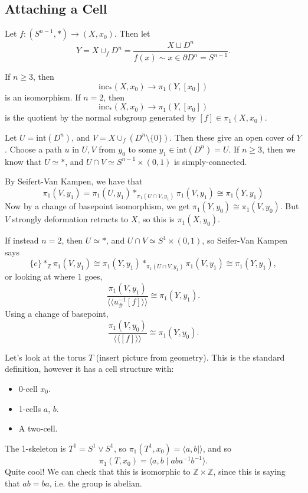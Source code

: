 \documentclass[12pt]{article}
\begin{document}
\subsection{Attaching a Cell}
\label{sub:+_cell}

Let $f : (S^{n-1}, \ast) \to (X, x_0)$. Then let
\[
Y = X \cup_f D^n = \frac{X \sqcup D^n}{f(x) \sim x \in \partial D^n = S^{n-1}}.
\]

\begin{theorem}
	If $n \geq 3$, then
	\[
		\mathrm{inc}_\ast (X, x_0) \to \pi_1(Y, [x_0])
	\]
	is an isomorphism. If $n = 2$, then
	\[
		\mathrm{inc}_\ast (X, x_0) \to \pi_1(Y, [x_0])
	\]
	is the quotient by the normal subgroup generated by $[f] \in \pi_1(X, x_0)$.
\end{theorem}


\begin{proofbox}
	Let $U = \mathrm{int}(D^n)$, and $V = X \cup_f (D^n \setminus \{0\})$. Then these give an open cover of $Y$. Choose a path $u$ in $U, V$ from $y_0$ to some $y_1 \in \mathrm{int}(D^n) = U$. If $n \geq 3$, then we know that $U \simeq \ast$, and $U \cap V \simeq S^{n-1} \times (0, 1)$ is simply-connected.

	By Seifert-Van Kampen, we have that
	\[
	\pi_1(V, y_1) = \pi_1(U, y_1) \ast_{\pi_1(U \cap V, y_1)} \pi_1(V, y_1) \cong \pi_1(Y, y_1)
	\]
	Now by a change of basepoint isomorphism, we get $\pi_1(Y, y_0) \cong \pi_1(V, y_0)$. But $V$ strongly deformation retracts to $X$, so this is $\pi_1(X, y_0)$.

	If instead $n = 2$, then $U \simeq \ast$, and $U \cap V \simeq S^1 \times (0, 1)$, so Seifer-Van Kampen says
	\[
		\{e\} \ast_{\mathbb{Z}} \pi_1(V, y_1) \cong  \pi_1(Y, y_1) \ast_{\pi_1(U \cap V, y_1)} \pi_1(V, y_1) \cong \pi_1(Y, y_1),
	\]
	or looking at where $1$ goes,
	\[
		\frac{\pi_1(V, y_1)}{\langle \langle u^{-1}_\# [f] \rangle \rangle} \cong \pi_1(Y, y_1).
	\]
	Using a change of basepoint,
	\[
		\frac{\pi_1(V, y_0)}{\langle \langle [f] \rangle \rangle} \cong \pi_1(Y, y_0).
	\]
\end{proofbox}

\begin{exbox}
	Let's look at the torus $T$ (insert picture from geometry). This is the standard definition, however it has a cell structure with:
	\begin{itemize}
		\item 0-cell $x_0$.
		\item 1-cells $a$, $b$.
		\item A two-cell.
	\end{itemize}
	The 1-skeleton is $T^1 = S^1 \vee S^1$, so $\pi_1(T^1, x_0) = \langle a, b \mid \rangle$, and so
	\[
	\pi_1(T, x_0) = \langle a, b \mid aba^{-1}b^{-1}\rangle.
	\]
	Quite cool! We can check that this is isomorphic to $\mathbb{Z} \times \mathbb{Z}$, since this is saying that $ab = ba$, i.e. the group is abelian.
\end{exbox}
\end{document}
